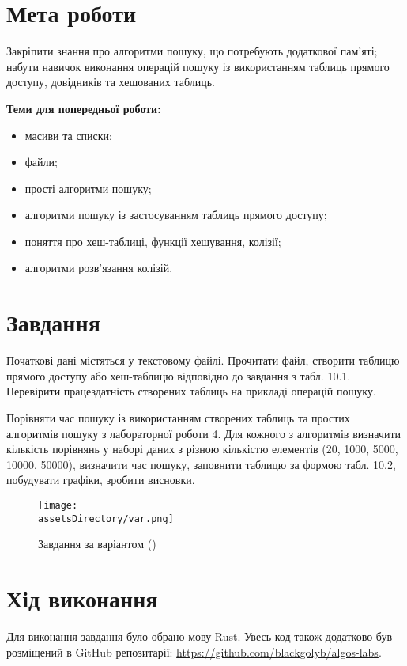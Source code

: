 \section{Мета роботи}
Закріпити знання про алгоритми пошуку, що потребують
додаткової пам’яті; набути навичок виконання операцій пошуку із
використанням таблиць прямого доступу, довідників та хешованих таблиць.

\noindent
\textbf{Теми для попередньої роботи:}
\begin{itemize}
    \item масиви та списки;
    \item файли;
    \item прості алгоритми пошуку;
    \item алгоритми пошуку із застосуванням таблиць прямого доступу;
    \item поняття про хеш-таблиці, функції хешування, колізії;
    \item алгоритми розв’язання колізій.
\end{itemize}


\section{Завдання}
Початкові дані містяться у текстовому файлі. Прочитати файл,
створити таблицю прямого доступу або хеш-таблицю відповідно до
завдання з табл. 10.1. Перевірити працездатність створених таблиць на
прикладі операцій пошуку.

Порівняти час пошуку із використанням створених таблиць та простих
алгоритмів пошуку з лабораторної роботи 4. Для кожного з алгоритмів
визначити кількість порівнянь у наборі даних з різною кількістю елементів
(20, 1000, 5000, 10000, 50000), визначити час пошуку, заповнити таблицю за
формою табл. 10.2, побудувати графіки, зробити висновки.

\begin{figure}[ht!]
    \centering
    \texttt{[image: \\assetsDirectory/var.png]}
    \caption{Завдання за варіантом (\variant)}
\end{figure}


\section{Хід виконання}
Для виконання завдання було обрано мову Rust.
Увесь код також додатково був розміщений в GitHub репозитарії: \href{https://github.com/blackgolyb/algos-labs}{https://github.com/blackgolyb/algos-labs}.


